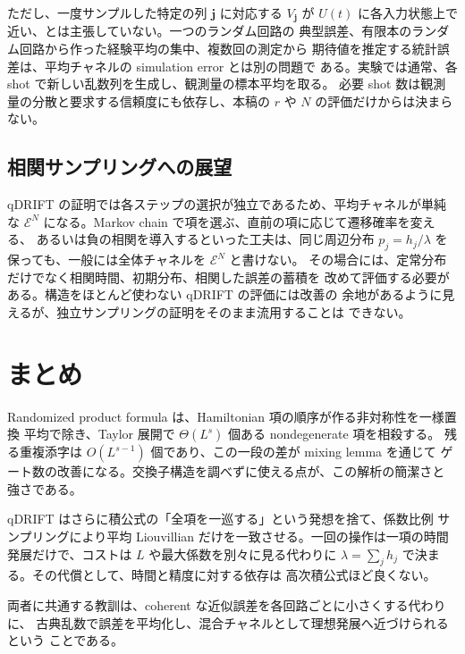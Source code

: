 \documentclass[uplatex,dvipdfmx,11pt,a4paper]{jsarticle}
\newcommand{\cE}{\mathcal{E}}
\begin{document}
ただし、一度サンプルした特定の列 $\bm j$ に対応する $V_{\bm j}$ が
$U(t)$ に各入力状態上で近い、とは主張していない。一つのランダム回路の
典型誤差、有限本のランダム回路から作った経験平均の集中、複数回の測定から
期待値を推定する統計誤差は、平均チャネルの simulation error とは別の問題で
ある。実験では通常、各 shot で新しい乱数列を生成し、観測量の標本平均を取る。
必要 shot 数は観測量の分散と要求する信頼度にも依存し、本稿の
$r$ や $N$ の評価だけからは決まらない。

\subsection{相関サンプリングへの展望}

qDRIFT の証明では各ステップの選択が独立であるため、平均チャネルが単純な
$\cE^N$ になる。Markov chain で項を選ぶ、直前の項に応じて遷移確率を変える、
あるいは負の相関を導入するといった工夫は、同じ周辺分布
$p_j=h_j/\lambda$ を保っても、一般には全体チャネルを $\cE^N$ と書けない。
その場合には、定常分布だけでなく相関時間、初期分布、相関した誤差の蓄積を
改めて評価する必要がある。構造をほとんど使わない qDRIFT の評価には改善の
余地があるように見えるが、独立サンプリングの証明をそのまま流用することは
できない。

\section{まとめ}

Randomized product formula は、Hamiltonian 項の順序が作る非対称性を一様置換
平均で除き、Taylor 展開で $\Theta(L^s)$ 個ある nondegenerate 項を相殺する。
残る重複添字は $O(L^{s-1})$ 個であり、この一段の差が mixing lemma を通じて
ゲート数の改善になる。交換子構造を調べずに使える点が、この解析の簡潔さと
強さである。

qDRIFT はさらに積公式の「全項を一巡する」という発想を捨て、係数比例
サンプリングにより平均 Liouvillian だけを一致させる。一回の操作は一項の時間
発展だけで、コストは $L$ や最大係数を別々に見る代わりに
$\lambda=\sum_jh_j$ で決まる。その代償として、時間と精度に対する依存は
高次積公式ほど良くない。

両者に共通する教訓は、coherent な近似誤差を各回路ごとに小さくする代わりに、
古典乱数で誤差を平均化し、混合チャネルとして理想発展へ近づけられるという
ことである。



\end{document}
